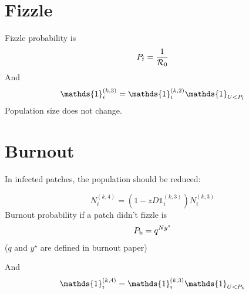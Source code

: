 \documentclass[12pt]{article}
\begin{document}
\section{Fizzle}
Fizzle probability is 
$$P_{\rm{f}}=\frac{1}{\mathcal{R}_0}$$
And
$$ \mathds{1}_i^{(k,3)}= \mathds{1}_i^{(k,2)} \mathds{1}_{U<P_{\rm{f}}}$$
Population size does not change.

\section{Burnout}
In infected patches, the population should be reduced:

$$ N_i^{(k,4)}=(1-zD\mathds{1}_i^{(k,3)})N_i^{(k,3)} $$
Burnout probability if a patch didn't fizzle is 
$$P_{\rm{b}}=q^{Ny^\star}$$
($q$ and $y^\star$ are defined in burnout paper)

And
$$ \mathds{1}_i^{(k,4)}= \mathds{1}_i^{(k,3)} \mathds{1}_{U<P_{\rm{b}}}$$
\end{document}
